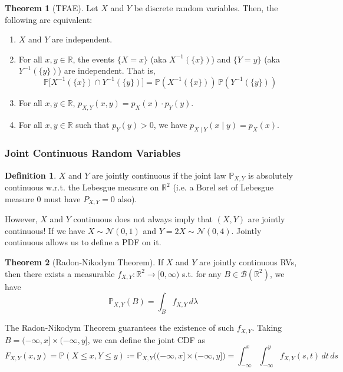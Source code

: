 \documentclass{article}
\theoremstyle{definition}
\newtheorem{theorem}{Theorem}[section]
\theoremstyle{remark}
\theoremstyle{definition}
\newtheorem{definition}{Definition}[section]
\begin{document}
\begin{theorem}[TFAE]
Let $X$ and $Y$ be discrete random variables. Then, the following are equivalent: 
\begin{enumerate}
    \item $X$ and $Y$ are independent. 
    \item For all $x, y \in \mathbb{R}$, the events $\{X = x\}$ (aka $X^{-1} (\{x\})$) and $\{Y = y\}$ (aka $Y^{-1} (\{y\})$) are independent. That is, 
    \[\mathbb{P} \big[ X^{-1}(\{x\}) \cap Y^{-1}(\{y\}) \big] = \mathbb{P}(X^{-1}(\{x\})) \, \mathbb{P}(Y^{-1}(\{y\}))\]
    \item For all $x, y \in \mathbb{R}$, $p_{X, Y} (x, y) = p_X (x) \cdot p_Y (y)$. 
    \item For all $x, y \in \mathbb{R}$ such that $p_Y (y) > 0$, we have $p_{X \mid Y}(x \mid y) = p_X (x)$. 
\end{enumerate}
\end{theorem}

\subsubsection{Joint Continuous Random Variables}

\begin{definition}
$X$ and $Y$ are jointly continuous if the joint law $\mathbb{P}_{X, Y}$ is absolutely continuous w.r.t. the Lebesgue measure on $\mathbb{R}^2$ (i.e. a Borel set of Lebesgue measure $0$ must have $P_{X, Y} = 0$ also). 
\end{definition}

However, $X$ and $Y$ continuous does not always imply that $(X, Y)$ are jointly continuous! If we have $X \sim \mathcal{N}(0, 1)$ and $Y = 2 X \sim \mathcal{N}(0, 4)$. Jointly continuous allows us to define a PDF on it. 

\begin{theorem}[Radon-Nikodym Theorem]
If $X$ and $Y$ are jointly continuous RVs, then there exists a measurable $f_{X, Y} : \mathbb{R}^2 \longrightarrow [0, \infty)$ s.t. for any $B \in \mathcal{B}(\mathbb{R}^2)$, we have 
\[\mathbb{P}_{X, Y} (B) = \int_B f_{X, Y} \, d\lambda\]
\end{theorem}

The Radon-Nikodym Theorem guarantees the existence of such $f_{X, Y}$. Taking $B = (-\infty, x] \times (-\infty, y]$, we can define the joint CDF as 
\[F_{X, Y} (x, y) = \mathbb{P}(X \leq x, Y \leq y) \coloneqq \mathbb{P}_{X, Y} \big( (-\infty, x] \times (-\infty, y] \bigg) = \int_{-\infty}^x \int_{-\infty}^y f_{X, Y} (s, t) \, dt \,ds\]
\end{document}

